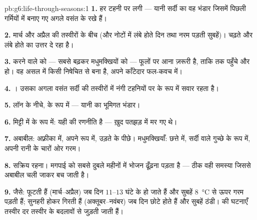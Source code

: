 \begin{solution}{pb:g6:life-through-seasons:1}
\textbf{1.} हर टहनी पर लगी  --- यानी सर्दी का वह भंडार जिसमें
पिछली गर्मियों में बनाए गए अगले वसंत के  रखे हैं।

\textbf{2.} मार्च और अप्रैल की तस्वीरों के बीच (और नोटों में लंबे होते
दिन तथा नरम पड़ती सुबहें)।  चढ़ते  और लंबे होते  का उत्तर
दे रहा है।

\textbf{3.}  करने वाले  को --- सबसे बढ़कर मधुमक्खियों को ---
फूलों पर आना ज़रूरी है, ताकि   तक पहुँचे और  हो।
वह  असल में किसी निषेचित  से बना  है, अपने काँटेदार फल-कवच
में।

\textbf{4.} । उसका अगला वसंत सर्दी की तस्वीरों में नंगी टहनियों
पर  के रूप में सवार रहता है।

\textbf{5.} लॉन के नीचे,  के रूप में --- यानी 
का भूमिगत भंडार।

\textbf{6.} मिट्टी में  के रूप में: यही  की रणनीति है ---
 ख़ुद पतझड़ में मर गए थे।

\textbf{7.} अबाबील: अफ़्रीका में, अपने  रूप में, उड़ते  के
पीछे। मधुमक्खियाँ: छत्ते में, सर्दी वाले गुच्छे के रूप में, अपनी रानी
के चारों ओर गरम।

\textbf{8.} सक्रिय रहना। मगपाई को सबसे दुबले महीनों में भोजन ढूँढ़ना
पड़ता है --- ठीक वही समस्या जिससे अबाबील चली जाकर बच जाती है।

\textbf{9.} जैसे:  फूटती हैं (मार्च--अप्रैल) जब दिन
$11$--$13$ घंटे के हो जाते हैं और सुबहें
\qty{8}{\degreeCelsius} से ऊपर गरम पड़ती हैं;  सुनहरी होकर
गिरती हैं (अक्तूबर--नवंबर) जब दिन छोटे होते हैं और सुबहें ठंडी।  की
घटनाएँ तस्वीर दर तस्वीर  के बदलावों से जुड़ती जाती हैं।


\end{solution}

